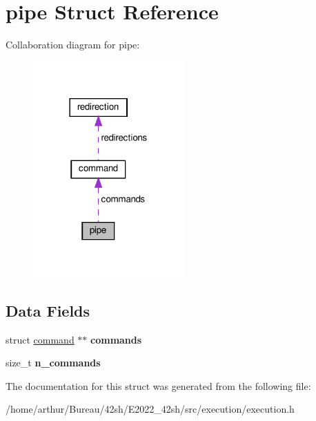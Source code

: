 \hypertarget{structpipe}{}\section{pipe Struct Reference}
\label{structpipe}


Collaboration diagram for pipe\+:
\nopagebreak
\begin{figure}[H]
\begin{center}
\leavevmode
\includegraphics[width=165pt]{structpipe__coll__graph}
\end{center}
\end{figure}
\subsection*{Data Fields}
\begin{DoxyCompactItemize}
\item 
\mbox{\label{structpipe_aa714eb714ae3c0f46ae50d82ec73e446}} 
struct \hyperlink{structcommand}{command} $\ast$$\ast$ {\bfseries commands}
\item 
\mbox{\label{structpipe_a22e0ecb1f67057d8da4931a61ba4a241}} 
size\+\_\+t {\bfseries n\+\_\+commands}
\end{DoxyCompactItemize}


The documentation for this struct was generated from the following file\+:\begin{DoxyCompactItemize}
\item 
/home/arthur/\+Bureau/42sh/\+E2022\+\_\+42sh/src/execution/execution.\+h\end{DoxyCompactItemize}
